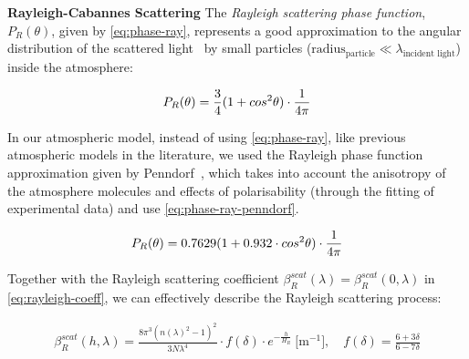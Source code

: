 \documentclass[journal]{vgtc}                %
\begin{document}
\noindent \textbf{Rayleigh-Cabannes Scattering} \quad The \textit{Rayleigh scattering phase function}, $P_R(\theta)$, given by \autoref{eq:phase-ray}, represents a good approximation to the angular distribution of the scattered light~\cite{Thomas:2017} by small particles ($\text{radius}_{\text{particle}} \ll \lambda_{\text{incident light}}$) inside the atmosphere:

\vspace*{-2mm}
\begin{equation} \label{eq:phase-ray}
\small
P_R(\theta) = \frac{3}{4}(1+cos^2\theta) \cdot\frac{1}{4\pi}
\end{equation}
\vspace*{-2mm}


In our atmospheric model, instead of using \autoref{eq:phase-ray}, like previous atmospheric models in the literature, we used the Rayleigh phase function approximation given by Penndorf~\cite{Penndorf:1957tables}, which takes into account the anisotropy of the atmosphere molecules and effects of polarisability (through the fitting of experimental data) and use \autoref{eq:phase-ray-penndorf}.

\vspace*{-2mm}
\begin{equation} \label{eq:phase-ray-penndorf}
\small
P_R(\theta) = 0.7629(1 + 0.932\cdot cos^2\theta) \cdot\frac{1}{4\pi}
\end{equation}
\vspace*{-2mm}

Together with the Rayleigh scattering coefficient $\beta_R^{scat}(\lambda) = \beta_R^{scat}(0, \lambda)$ in \autoref{eq:rayleigh-coeff}, we can effectively describe the Rayleigh scattering process:

\vspace*{-4mm}
{
  \small
\begin{align}
\beta_R^{scat}(h, \lambda) = \frac{8\pi^3(n(\lambda)^2-1)^2}{3N\lambda^4} \cdot f(\delta) \cdot e^{-\frac{h}{H_R}}\ \big[\text{m}^{-1}\big] \label{eq:rayleigh-coeff}, \quad f(\delta) = \frac{6 + 3\delta}{6 - 7\delta}
\end{align}
}
\vspace*{-4mm}

\end{document}
